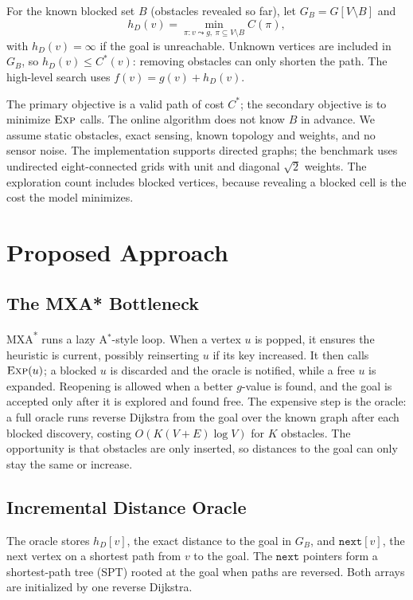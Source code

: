 \documentclass[conference]{IEEEtran}
\newcommand{\hD}{h_{D}}
\newcommand{\Exp}{\textsc{Exp}}
\newcommand{\MXA}{MXA\textsuperscript{*}}
\begin{document}
For the known blocked set $B$ (obstacles revealed so far), let $G_B=G[V\setminus B]$ and
\begin{equation}
\hD(v)=\min_{\pi:v\leadsto g,\ \pi\subseteq V\setminus B} C(\pi),
\end{equation}
with $\hD(v)=\infty$ if the goal is unreachable. Unknown vertices are included in $G_B$, so $\hD(v)\le C^*(v)$: removing obstacles can only shorten the path. The high-level search uses $f(v)=g(v)+\hD(v)$.

The primary objective is a valid path of cost $C^*$; the secondary objective is to minimize $\Exp$ calls. The online algorithm does not know $B$ in advance. We assume static obstacles, exact sensing, known topology and weights, and no sensor noise. The implementation supports directed graphs; the benchmark uses undirected eight-connected grids with unit and diagonal $\sqrt{2}$ weights. The exploration count includes blocked vertices, because revealing a blocked cell is the cost the model minimizes.

\section{Proposed Approach}
\label{sec:approach}
\subsection{The MXA* Bottleneck}
\MXA{} runs a lazy A$^*$-style loop. When a vertex $u$ is popped, it ensures the heuristic is current, possibly reinserting $u$ if its key increased. It then calls $\Exp(u)$; a blocked $u$ is discarded and the oracle is notified, while a free $u$ is expanded. Reopening is allowed when a better $g$-value is found, and the goal is accepted only after it is explored and found free. The expensive step is the oracle: a full oracle runs reverse Dijkstra from the goal over the known graph after each blocked discovery, costing $O(K(V+E)\log V)$ for $K$ obstacles. The opportunity is that obstacles are only inserted, so distances to the goal can only stay the same or increase.

\subsection{Incremental Distance Oracle}
The oracle stores $\hD[v]$, the exact distance to the goal in $G_B$, and $\texttt{next}[v]$, the next vertex on a shortest path from $v$ to the goal. The $\texttt{next}$ pointers form a shortest-path tree (SPT) rooted at the goal when paths are reversed. Both arrays are initialized by one reverse Dijkstra.
\end{document}
